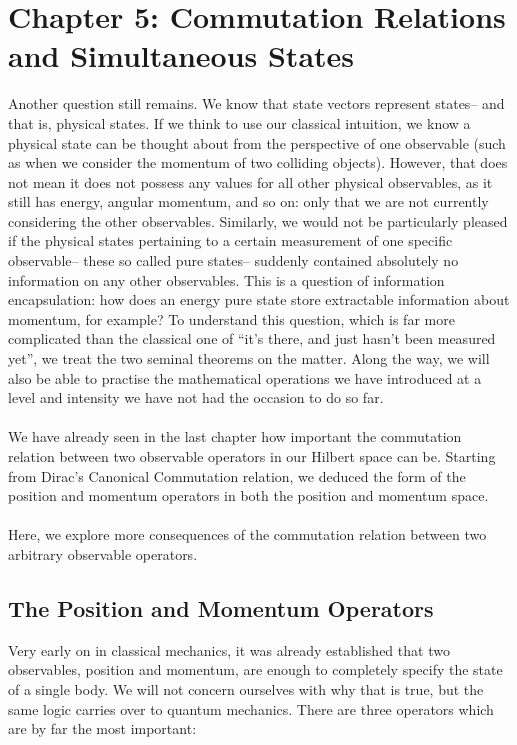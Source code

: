 \chapter{Chapter 5: Commutation Relations and Simultaneous States}
Another question still remains. We know that state vectors represent states-- and that is, physical states. If we think to use our classical intuition, we know a physical state can be thought about from the perspective of one observable (such as when we consider the momentum of two colliding objects). However, that does not mean it does not possess any values for all other physical observables, as it still has energy, angular momentum, and so on: only that we are not currently considering the other observables. Similarly, we would not be particularly pleased if the physical states pertaining to a certain measurement of one specific observable-- these so called pure states-- suddenly contained absolutely no information on any other observables. This is a question of information encapsulation: how does an energy pure state store extractable information about momentum, for example? To understand this question, which is far more complicated than the classical one of ``it's there, and just hasn't been measured yet'', we treat the two seminal theorems on the matter. Along the way, we will also be able to practise the mathematical operations we have introduced at a level and intensity we have not had the occasion to do so far.
\\\\
We have already seen in the last chapter how important the commutation relation between two observable operators in our Hilbert space can be. Starting from Dirac's Canonical Commutation relation, we deduced the form of the position and momentum operators in both the position and momentum space.
\\\\
Here, we explore more consequences of the commutation relation between two arbitrary observable operators.
\section{The Position and Momentum Operators}
Very early on in classical mechanics, it was already established that two observables, position and momentum, are enough to completely specify the state of a single body. We will not concern ourselves with why that is true, but the same logic carries over to quantum mechanics. There are three operators which are by far the most important:
